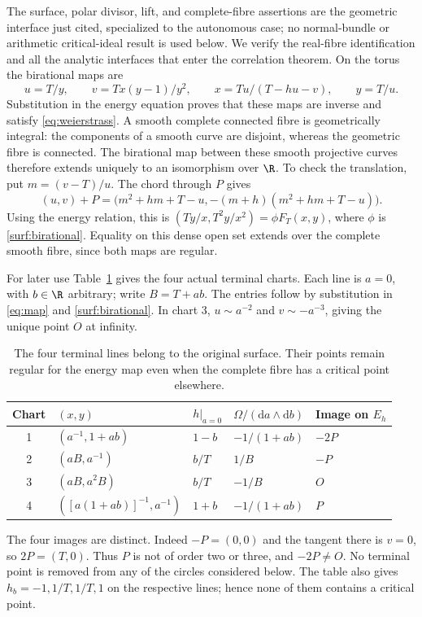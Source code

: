 The surface, polar divisor, lift, and complete-fibre assertions are the
geometric interface just cited, specialized to the autonomous case;
no normal-bundle or arithmetic critical-ideal result is used below.
We verify the real-fibre identification and all the analytic interfaces
that enter the correlation theorem. On the torus the birational maps are
\begin{equation}
 u=T/y,\qquad v=Tx(y-1)/y^2,\qquad
 x=Tu/(T-hu-v),\qquad y=T/u.
 \label{surf:birational}
\end{equation}
Substitution in the energy equation proves that these maps are inverse
and satisfy \eqref{eq:weierstrass}. A smooth complete connected fibre
is geometrically integral: the components of a smooth curve are
disjoint, whereas the geometric fibre is connected. The birational
map between these smooth projective curves therefore extends uniquely
to an isomorphism over $\R$. To check the translation, put
$m=(v-T)/u$. The chord through $P$ gives
\[
 (u,v)+P=
 \bigl(m^2+hm+T-u,-(m+h)(m^2+hm+T-u)\bigr).
\]
Using the energy relation, this is
$(Ty/x,T^2y/x^2)=\phi F_T(x,y)$, where $\phi$ is
\eqref{surf:birational}. Equality on this dense open set extends over
the complete smooth fibre, since both maps are regular.

For later use Table~\ref{surf:terminal-table} gives the four actual
terminal charts. Each line is $a=0$, with $b\in\R$ arbitrary; write
$B=T+ab$. The entries follow by substitution in \eqref{eq:map} and
\eqref{surf:birational}. In chart 3, $u\sim a^{-2}$ and
$v\sim-a^{-3}$, giving the unique point $O$ at infinity.
\begin{table}[htbp]
\centering
\begin{tabular}{@{}cllll@{}}
\toprule
Chart & $(x,y)$ & $h|_{a=0}$ & $\Omega/(\mathrm da\wedge\mathrm db)$ & Image on $E_h$\\
\midrule
1 & $(a^{-1},1+ab)$ & $1-b$ & $-1/(1+ab)$ & $-2P$\\
2 & $(aB,a^{-1})$ & $b/T$ & $1/B$ & $-P$\\
3 & $(aB,a^2B)$ & $b/T$ & $-1/B$ & $O$\\
4 & $([a(1+ab)]^{-1},a^{-1})$ & $1+b$ & $-1/(1+ab)$ & $P$\\
\bottomrule
\end{tabular}
\caption{The four terminal lines belong to the original surface.
Their points remain regular for the energy map even when the complete
fibre has a critical point elsewhere.}
\label{surf:terminal-table}
\end{table}
The four images are distinct. Indeed $-P=(0,0)$ and the tangent there
is $v=0$, so $2P=(T,0)$. Thus $P$ is not of order two or three,
and $-2P\ne O$. No terminal point is removed from any of the circles
considered below. The table also gives $h_b=-1,1/T,1/T,1$ on the
respective lines; hence none of them contains a critical point.

